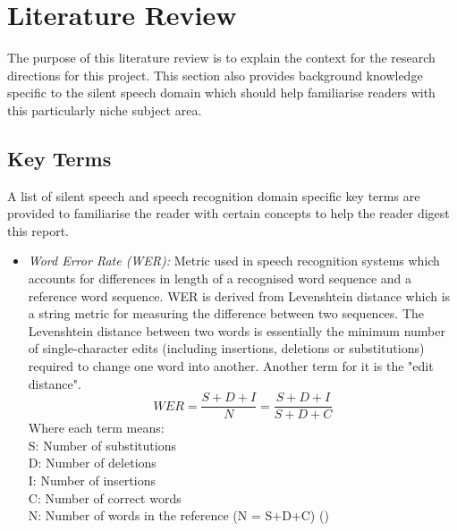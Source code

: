 \chapter{Literature Review} \label{chap:lit-review}

The purpose of this literature review is to explain the context
for the research directions for this project. This section also
provides background knowledge specific to the silent speech
domain which should help familiarise readers with this particularly
niche subject area.

\section{Key Terms}

A list of silent speech and speech recognition domain specific key terms are provided
to familiarise the reader with certain concepts to help the reader digest this report.

\begin{itemize}
\item \emph{Word Error Rate (WER):}
Metric used in speech recognition systems which accounts for differences in length of
a recognised word sequence and a reference word sequence. WER is derived from
Levenshtein distance  which is a string metric for measuring the difference between two
sequences. The Levenshtein distance between two words is essentially the minimum number of
single-character edits (including insertions, deletions or substitutions) required to
change one word into another. Another term for it is the "edit distance".
\[
  WER
  = \dfrac{S + D + I}{N}
  = \dfrac{S + D + I}{S + D + C}
\]
Where each term means:\\
S: Number of substitutions\\
D: Number of deletions\\
I: Number of insertions\\
C: Number of correct words\\
N: Number of words in the reference (N = S+D+C)
(\cite{1966SPhD...10..707L})
\end{itemize}